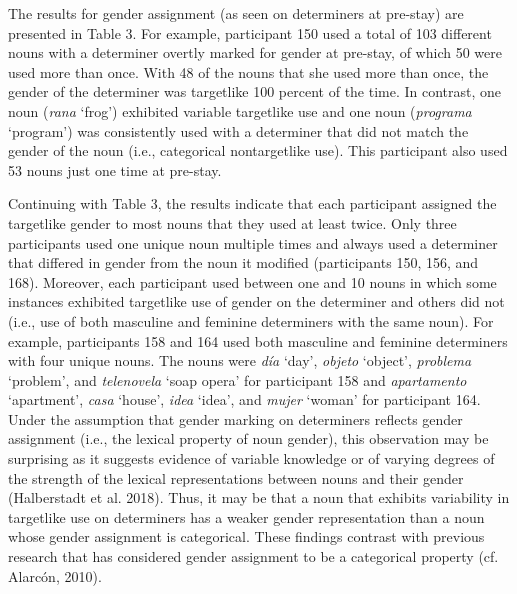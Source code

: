 \documentclass[12pt]{article}
\newenvironment{styleNoSpacing}{\setlength\leftskip{0cm}\setlength\rightskip{0cm plus 1fil}\setlength\parindent{0cm}\setlength\parfillskip{0pt plus 1fil}\setlength\parskip{0cm plus 1pt}\writerlistparindent\writerlistleftskip\leavevmode\normalfont\normalsize\fontsize{11pt}{13.2pt}\selectfont\writerlistlabel\ignorespaces}{\unskip\vspace{0cm plus 1pt}\par}
\newcommand\writerlistleftskip{}
\newcommand\writerlistparindent{}
\newcommand\writerlistlabel{}
\begin{document}
\begin{styleNoSpacing}
The results for gender assignment (as seen on determiners at pre-stay) are presented in Table 3. For example, participant 150 used a total of 103 different nouns with a determiner overtly marked for gender at pre-stay, of which 50 were used more than once. With 48 of the nouns that she used more than once, the gender of the determiner was targetlike 100 percent of the time. In contrast, one noun (\textit{rana} ‘frog’) exhibited variable targetlike use and one noun (\textit{programa} ‘program’) was consistently used with a determiner that did not match the gender of the noun (i.e., categorical nontargetlike use). This participant also used 53 nouns just one time at pre-stay. 
\end{styleNoSpacing}

\begin{styleNoSpacing}
Continuing with Table 3, the results indicate that each participant assigned the targetlike gender to most nouns that they used at least twice. Only three participants used one unique noun multiple times and always used a determiner that differed in gender from the noun it modified (participants 150, 156, and 168). Moreover, each participant used between one and 10 nouns in which some instances exhibited targetlike use of gender on the determiner and others did not (i.e., use of both masculine and feminine determiners with the same noun). For example, participants 158 and 164 used both masculine and feminine determiners with four unique nouns. The nouns were \textit{día} ‘day’, \textit{objeto }‘object’,\textit{ problema }‘problem’, and\textit{ telenovela} ‘soap opera’ for participant 158 and \textit{apartamento }‘apartment’,\textit{ casa }‘house’,\textit{ idea }‘idea’, and \textit{mujer }‘woman’ for participant 164. Under the assumption that gender marking on determiners reflects gender assignment (i.e., the lexical property of noun gender), this observation may be surprising as it suggests evidence of variable knowledge or of varying degrees of the strength of the lexical representations between nouns and their gender (Halberstadt et al. 2018). Thus, it may be that a noun that exhibits variability in targetlike use on determiners has a weaker gender representation than a noun whose gender assignment is categorical. These findings contrast with previous research that has considered gender assignment to be a categorical property (cf. Alarcón, 2010). 
\end{styleNoSpacing}
\end{document}
